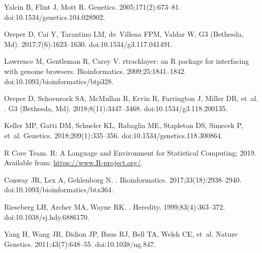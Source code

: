 \documentclass[10pt,letterpaper]{article}
\begin{document}
\begin{thebibliography}{10}
Yalcin B, Flint J, Mott R.
\newblock Genetics. 2005;171(2):673--81.
\newblock doi:{10.1534/genetics.104.028902}.

Oreper D, Cai Y, Tarantino LM, de~Villena FPM, Valdar W.
\newblock G3 (Bethesda, Md). 2017;7(6):1623--1630.
\newblock doi:{10.1534/g3.117.041491}.

Lawrence M, Gentleman R, Carey V.
\newblock rtracklayer: an R package for interfacing with genome browsers.
\newblock Bioinformatics. 2009;25:1841--1842.
\newblock doi:{10.1093/bioinformatics/btp328}.

Oreper D, Schoenrock SA, McMullan R, Ervin R, Farrington J, Miller DR, et~al.
.
\newblock G3 (Bethesda, Md). 2018;8(11):3447--3468.
\newblock doi:{10.1534/g3.118.200135}.

Keller MP, Gatti DM, Schueler KL, Rabaglia ME, Stapleton DS, Simecek P, et~al.
\newblock Genetics. 2018;209(1):335--356.
\newblock doi:{10.1534/genetics.118.300864}.

{R Core Team}. R: A Language and Environment for Statistical Computing; 2019.
\newblock Available from: \url{https://www.R-project.org/}.

Conway JR, Lex A, Gehlenborg N.
.
\newblock Bioinformatics. 2017;33(18):2938--2940.
\newblock doi:{10.1093/bioinformatics/btx364}.

Rieseberg LH, Archer MA, Wayne RK.
.
\newblock Heredity. 1999;83(4):363--372.
\newblock doi:{10.1038/sj.hdy.6886170}.

Yang H, Wang JR, Didion JP, Buus RJ, Bell TA, Welsh CE, et~al.
\newblock Nature Genetics. 2011;43(7):648--55.
\newblock doi:{10.1038/ng.847}.


\end{thebibliography}
\end{document}
